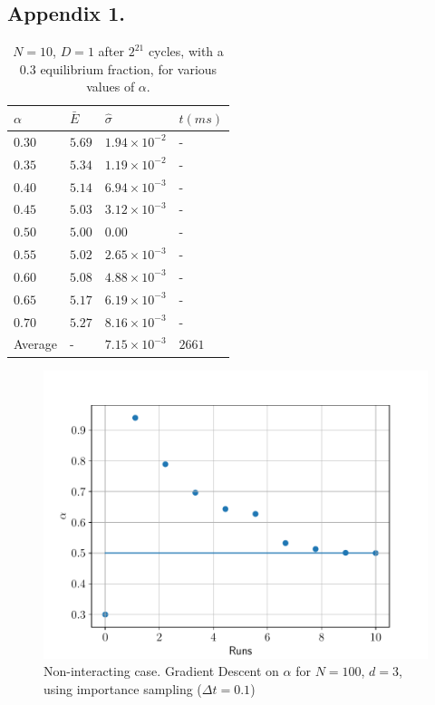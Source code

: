 \documentclass[%
oneside,                 %
final,                   %
10pt]{article}
\begin{document}
\begin{appendices}
\section{Appendix 1.} \label{APP_1}
\begin{table}[h!]
\begin{center}
\begin{tabular}{llll}
\hline
 $\alpha$ & $\bar{E} $ & $\hat \sigma$ & $t (ms)$ \\
\hline
$0.30$ 	  & $5.69$ & $1.94 \times 10^{-2}$ &  - \\  
$0.35$ 	  & $5.34$ & $1.19 \times 10^{-2}$ & -  \\  
$0.40$ 	  & $5.14$ & $6.94 \times 10^{-3}$ & -  \\  
$0.45$ 	  & $5.03$ & $3.12 \times 10^{-3}$ & -  \\  
$0.50$ 	  & $5.00$ & $0.00$ & -  \\  
$0.55$ 	  & $5.02$ & $2.65 \times 10^{-3}$ & -  \\  
$0.60$ 	  & $5.08$ & $4.88 \times 10^{-3}$ & -  \\  
$0.65$ 	  & $5.17$ & $6.19 \times 10^{-3}$ & -  \\  
$0.70$ 	  & $5.27$ & $8.16 \times 10^{-3}$ & -  \\  
Average   &    -	& $7.15 \times 10^{-3}$ & $2661$\\
\hline
\end{tabular}
\end{center}
\caption{$N=10$, $D=1$ after $2^{21}$ cycles, with a $0.3$ equilibrium fraction, for various values of $\alpha$.}
\label{table:N10D1}
\end{table}

\begin{figure}[!h]
        \centering 
         \includegraphics[scale=0.6]{../Results/Data_analysis/GD.pdf} 
        \caption{Non-interacting case. Gradient Descent on $\alpha$ for $N=100$, $d=3$, using importance sampling ($\Delta t=0.1$)}
        \label{fig:GD}   
\end{figure}  



\end{appendices}
\end{document}
